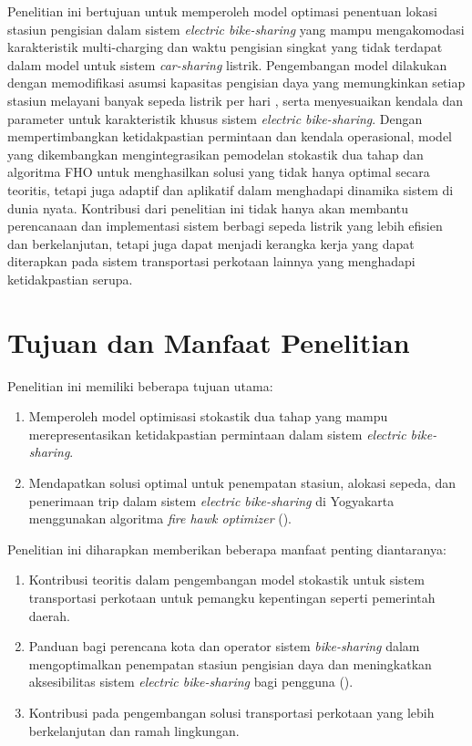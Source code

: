 Penelitian ini bertujuan untuk memperoleh model optimasi penentuan lokasi stasiun pengisian dalam sistem \textit{electric bike-sharing} yang mampu mengakomodasi karakteristik multi-charging dan waktu pengisian singkat yang tidak terdapat dalam model  untuk sistem \textit{car-sharing} listrik. Pengembangan model dilakukan dengan memodifikasi asumsi kapasitas pengisian daya yang memungkinkan setiap stasiun melayani banyak sepeda listrik per hari , serta menyesuaikan kendala dan parameter untuk karakteristik khusus sistem \textit{electric bike-sharing}. Dengan mempertimbangkan ketidakpastian permintaan dan kendala operasional, model yang dikembangkan mengintegrasikan pemodelan stokastik dua tahap dan algoritma FHO untuk menghasilkan solusi yang tidak hanya optimal secara teoritis, tetapi juga adaptif dan aplikatif dalam menghadapi dinamika sistem di dunia nyata. Kontribusi dari penelitian ini tidak hanya akan membantu perencanaan dan implementasi sistem berbagi sepeda listrik yang lebih efisien dan berkelanjutan, tetapi juga dapat menjadi kerangka kerja yang dapat diterapkan pada sistem transportasi perkotaan lainnya yang menghadapi ketidakpastian serupa.

\section{Tujuan dan Manfaat Penelitian}

Penelitian ini memiliki beberapa tujuan utama:
\begin{enumerate}
    \item Memperoleh model optimisasi stokastik dua tahap yang mampu merepresentasikan ketidakpastian permintaan dalam sistem \textit{electric bike-sharing}.
    \item Mendapatkan solusi optimal untuk penempatan stasiun, alokasi sepeda, dan penerimaan trip dalam sistem \textit{electric bike-sharing} di Yogyakarta menggunakan algoritma \textit{fire hawk optimizer} ().
\end{enumerate}

Penelitian ini diharapkan memberikan beberapa manfaat penting diantaranya:
\begin{enumerate}
    \item Kontribusi teoritis dalam pengembangan model stokastik untuk sistem transportasi perkotaan untuk pemangku kepentingan seperti pemerintah daerah.
    \item Panduan bagi perencana kota dan operator sistem \textit{bike-sharing} dalam mengoptimalkan penempatan stasiun pengisian daya dan meningkatkan aksesibilitas sistem \textit{electric bike-sharing} bagi pengguna ().
    \item Kontribusi pada pengembangan solusi transportasi perkotaan yang lebih berkelanjutan dan ramah lingkungan.
\end{enumerate}

